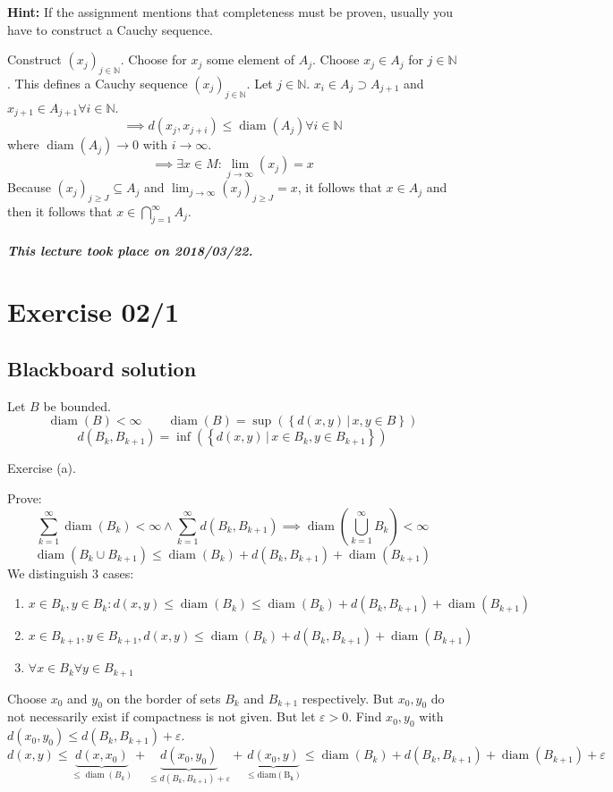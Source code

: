 \documentclass{article}
\newcommand{\setdef}[2]{\left\{\left.#1\,\right|\,#2\right\}}
\newcommand{\dateref}[1]{\paragraph{\textit{This lecture took place on #1.}}}
\begin{document}
\textbf{Hint:} If the assignment mentions that completeness must be proven, usually you have to construct a Cauchy sequence.

Construct $(x_j)_{j \in \mathbb N}$. Choose for $x_j$ some element of $A_j$.
Choose $x_j \in A_j$ for $j \in \mathbb N$.
This defines a Cauchy sequence $(x_j)_{j \in \mathbb N}$.
Let $j \in \mathbb N$.
$x_i \in A_j \supset A_{j+1}$ and $x_{j+1} \in A_{j+1} \forall i \in \mathbb N$.
\[ \implies d(x_j, x_{j+i}) \leq \operatorname{diam}(A_j) \forall i \in \mathbb N \]
where $\operatorname{diam}(A_j) \to 0$ with $i \to \infty$.
\[ \implies \exists x \in M: \lim_{j \to \infty}(x_j) = x \]
Because $(x_j)_{j\geq J} \subseteq A_j$ and $\lim_{j\to\infty} (x_j)_{j\geq J} = x$,
it follows that $x \in A_j$ and then it follows that $x \in \bigcap_{j=1}^\infty A_j$.

\dateref{2018/03/22}

\section{Exercise 02/1}

\subsection{Blackboard solution}

Let $B$ be bounded.
\[ \operatorname{diam}(B) < \infty \qquad \operatorname{diam}(B) = \operatorname{sup}(\setdef{d(x,y)}{x,y \in B}) \]
\[ d(B_k, B_{k+1}) = \operatorname{inf}(\setdef{d(x,y)}{x \in B_k, y \in B_{k+1}}) \]

Exercise (a).

Prove:
\[ \sum_{k=1}^\infty \operatorname{diam}(B_k) < \infty \land \sum_{k=1}^\infty d(B_k, B_{k+1}) \implies \operatorname{diam}(\bigcup_{k=1}^{\infty} B_k) < \infty \]
\[ \operatorname{diam}(B_k \cup B_{k+1}) \leq \operatorname{diam}(B_k) + d(B_k, B_{k+1}) + \operatorname{diam}(B_{k+1}) \]
We distinguish 3 cases:
\begin{enumerate}
  \item $x \in B_k, y \in B_k: d(x,y) \leq \operatorname{diam}(B_k) \leq \operatorname{diam}(B_k) + d(B_k, B_{k+1}) + \operatorname{diam}(B_{k+1})$
  \item $x \in B_{k+1}, y \in B_{k+1}, d(x, y) \leq \operatorname{diam}(B_k) + d(B_k, B_{k+1}) + \operatorname{diam}(B_{k+1})$
  \item $\forall x \in B_{k} \forall y \in B_{k+1}$
\end{enumerate}
Choose $x_0$ and $y_0$ on the border of sets $B_k$ and $B_{k+1}$ respectively.
But $x_0, y_0$ do not necessarily exist if compactness is not given.
But let $\varepsilon > 0$. Find $x_0, y_0$ with $d(x_0, y_0) \leq d(B_k, B_{k+1}) + \varepsilon$.
\[ d(x,y) \leq \underbrace{d(x,x_0)}_{\leq \operatorname{diam}(B_k)} + \underbrace{d(x_0, y_0)}_{\leq d(B_k, B_{k+1}) + \varepsilon} + \underbrace{d(x_0, y)}_{\leq \operatorname{diam(B_k)}} \leq \operatorname{diam}(B_k) + d(B_k, B_{k+1}) + \operatorname{diam}(B_{k+1}) + \varepsilon \]
\end{document}
